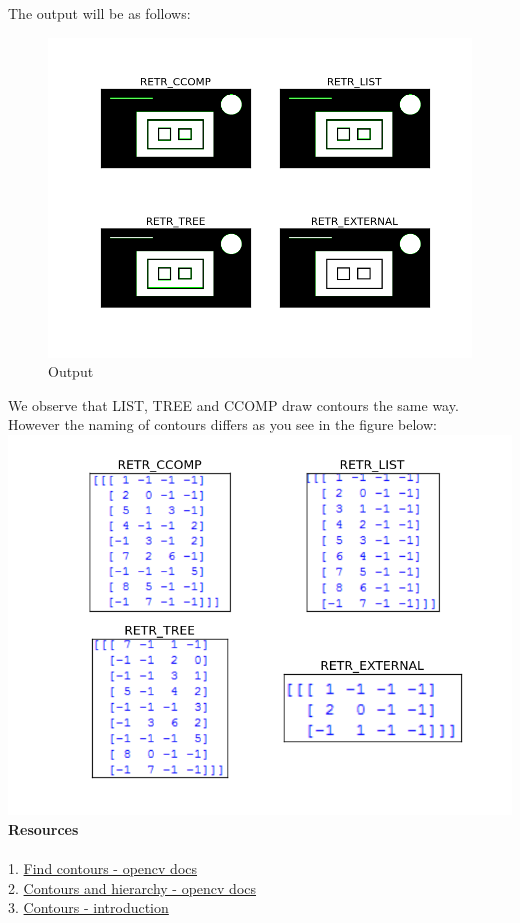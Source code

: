 \documentclass[]{article}
\begin{document}
The output will be as follows:

\begin{figure}[htbp]
\centering
\includegraphics{heir1.png}
\caption{Output}
\end{figure}

We observe that LIST, TREE and CCOMP draw contours the same way. However
the naming of contours differs as you see in the figure below:\\
\includegraphics{heir2.png} \\

\LARGE{\textbf{Resources}} \\
\\
1. \href{http://docs.opencv.org/modules/imgproc/doc/structural
\_analysis\_and\_shape\_descriptors.html\#findcontours}{Find contours - opencv docs} \\
2. \href{http://docs.opencv.org/trunk/d9/d8b/tutorial\_py\_contours
\_hierarchy.html}{Contours and hierarchy - opencv docs} \\
3. \href{http://opencv-python-tutroals.readthedocs.org/en/latest/py
\_tutorials/py\_imgproc/py\_contours/py\_contours\_begin/py
\_contours\_begin.html\#contours-getting-started}{Contours - introduction}
\end{document}
